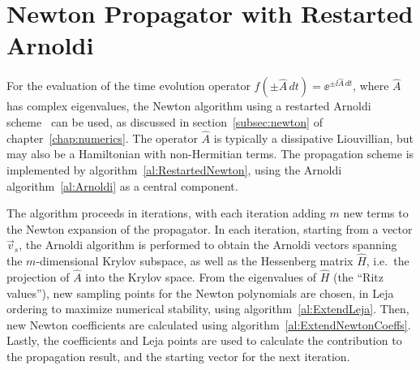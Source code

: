 \clearpage


\section{Newton Propagator with Restarted Arnoldi}

For the evaluation of the time evolution operator
$f(\pm\hat{A}\,dt) = \ee^{\pm\ii \hat{A}\,dt}$, where $\hat{A}$ has complex
eigenvalues, the Newton algorithm using a restarted Arnoldi
scheme~\cite{Tal-EzerSJSC2007} can be used, as discussed
in section~\ref{subsec:newton} of chapter~\ref{chap:numerics}. The
operator $\hat{A}$ is typically a dissipative Liouvillian, but may also be
a Hamiltonian with non-Hermitian terms. The propagation scheme is implemented by
algorithm~\ref{al:RestartedNewton}, using the Arnoldi
algorithm~\ref{al:Arnoldi} as a central component.

The algorithm proceeds in iterations, with each iteration adding $m$ new terms
to the Newton expansion of the propagator. In each iteration, starting from
a vector $\vec{v}_s$, the Arnoldi algorithm is performed to obtain the Arnoldi
vectors spanning the $m$-dimensional Krylov subspace, as well as the Hessenberg
matrix $\hat{H}$, i.e.\ the projection of $\hat{A}$ into the Krylov space. From
the eigenvalues of $\hat{H}$ (the ``Ritz values''),
new sampling points for the Newton polynomials are chosen, in Leja ordering to
maximize numerical stability, using algorithm~\ref{al:ExtendLeja}. Then, new
Newton coefficients are calculated using
algorithm~\ref{al:ExtendNewtonCoeffs}. Lastly, the coefficients and Leja points
are used to calculate the contribution to the propagation result, and the
starting vector for the next iteration.

